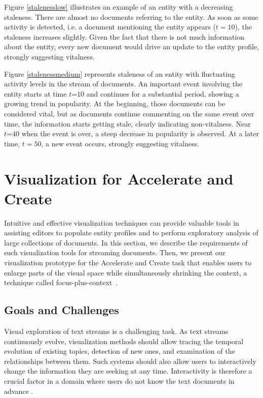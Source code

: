 \documentclass{article}
\begin{document}
Figure \ref{stalenesslow} illustrates an example of an entity with a decreasing staleness. 
There are almost no documents referring to the entity. 
As soon as some activity is detected, i.e. a document mentioning the entity appears ($t=10$), the staleness increases slightly. 
Given the fact that there is not much information about the entity, every new document would drive an update to the entity profile, strongly suggesting vitalness.

Figure \ref{stalenessmedium} represents staleness of an entity with fluctuating activity levels in the stream of documents. An important event involving the entity starts at time $t\mathord{=}10$ and continues for a substantial period, showing a growing trend in popularity. 
At the beginning, those documents can be considered vital, but as documents continue commenting on the same event over time, the information starts getting stale, clearly indicating non-vitalness.
Near $t\mathord{=}40$ when the event is over, a steep decrease in popularity is observed. At a later time, $t=50$, a new event occurs, strongly suggesting vitalness.

\section{Visualization for Accelerate and Create}

Intuitive and effective visualization techniques can provide valuable tools in assisting editors to populate entity profiles and to perform exploratory analysis of large collections of documents. 
In this section, we describe the requirements of such visualization tools for streaming documents.
Then, we present our visualization prototype for the Accelerate and Create task that enables users to enlarge parts of the visual space while simultaneously shrinking the context, a technique called focus-plus-context~\cite{Artur2010}.

\subsection{Goals and Challenges}

Visual exploration of text streams is a challenging task. As text streams continuously evolve, visualization methods should allow tracing the temporal evolution of existing topics, detection of new ones, and examination of the relationships between them.
Such systems should also allow users to interactively change the information they are seeking at any time. 
Interactivity is therefore a crucial factor in a domain where users do not know the text documents in advance \cite{AlsakranCLZYDL12}.
\end{document}
